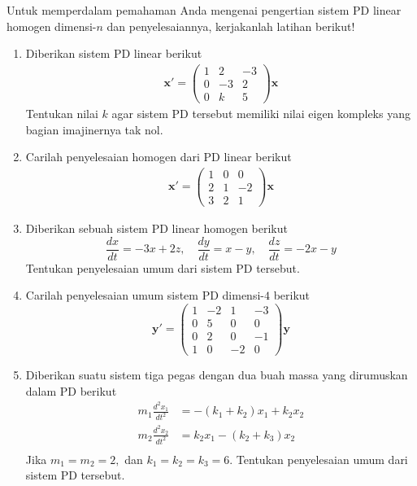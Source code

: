\documentclass[a4paper]{article}
\theoremstyle{definisi}
\numberwithin{equation}{section}
\begin{document}
  \newpage
  \noindent Untuk memperdalam pemahaman Anda mengenai pengertian sistem PD linear homogen dimensi-$n$ dan penyelesaiannya, kerjakanlah latihan berikut!
  \begin{enumerate}
    \item Diberikan sistem PD linear berikut
    \begin{align*}
      \mathbf{x'} = \begin{pmatrix}
        1 & 2 & -3\\
        0 & -3 & 2\\
        0 & k & 5
      \end{pmatrix}\mathbf{x}
    \end{align*}
    Tentukan nilai $k$ agar sistem PD tersebut memiliki nilai eigen kompleks yang bagian imajinernya tak nol.
    \item Carilah penyelesaian homogen dari PD linear berikut
    \begin{align*}
      \mathbf{x'} = \begin{pmatrix}
        1 & 0 & 0\\
        2 & 1 & -2\\
        3 & 2 & 1
      \end{pmatrix}\mathbf{x}
    \end{align*}

    \item Diberikan sebuah sistem PD linear homogen berikut
    \begin{equation*}
        \frac{dx}{dt}=-3x+2z,\quad
        \frac{dy}{dt}=x-y,\quad
        \frac{dz}{dt}=-2x-y
    \end{equation*}
    Tentukan penyelesaian umum dari sistem PD tersebut.
    
    \item Carilah penyelesaian umum sistem PD dimensi-$4$ berikut
    \[\mathbf{y'}=\begin{pmatrix}
      1 & -2 & 1 & -3\\
      0 & 5 & 0 & 0\\
      0 & 2 & 0 & -1\\
      1 & 0 & -2 & 0
    \end{pmatrix}\mathbf{y}\]
    
    \item Diberikan suatu sistem tiga pegas dengan dua buah massa yang dirumuskan dalam PD berikut
    \begin{equation*}
      \begin{split}
        m_1\frac{d^2x_1}{dt^2}&=-(k_1+k_2)x_1+k_2x_2\\
        m_2\frac{d^2x_2}{dt^2}&=k_2x_1-(k_2+k_3)x_2\\
      \end{split}
    \end{equation*}
    Jika $m_1=m_2=2,$ dan $k_1=k_2=k_3=6$. Tentukan penyelesaian umum dari sistem PD tersebut.
  \end{enumerate}
\end{document}

